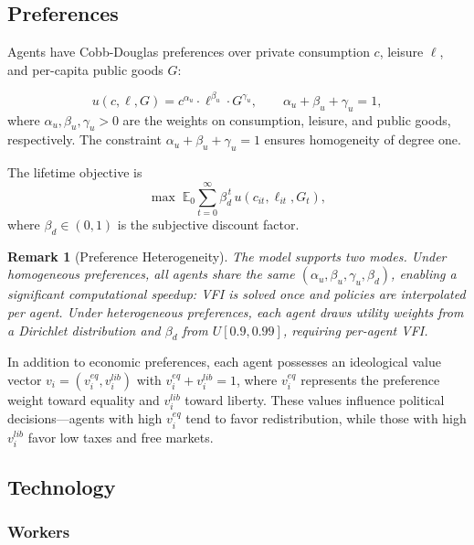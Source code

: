 \documentclass[12pt]{article}
\newtheorem{remark}{Remark}
\newcommand{\E}{\mathbb{E}}
\begin{document}
\subsection{Preferences}\label{sec:preferences}

Agents have Cobb-Douglas preferences over private consumption $c$, leisure $\ell$, and per-capita public goods $G$:

\begin{equation}\label{eq:utility}
  u(c, \ell, G) = c^{\alpha_u} \cdot \ell^{\beta_u} \cdot G^{\gamma_u}, \qquad \alpha_u + \beta_u + \gamma_u = 1,
\end{equation}
where $\alpha_u, \beta_u, \gamma_u > 0$ are the weights on consumption, leisure, and public goods, respectively. The constraint $\alpha_u + \beta_u + \gamma_u = 1$ ensures homogeneity of degree one.

The lifetime objective is
\begin{equation}\label{eq:lifetime}
  \max \; \E_0 \sum_{t=0}^{\infty} \beta_d^{\, t} \, u(c_{it}, \ell_{it}, G_t),
\end{equation}
where $\beta_d \in (0, 1)$ is the subjective discount factor.

\begin{remark}[Preference Heterogeneity]
The model supports two modes. Under \emph{homogeneous preferences}, all agents share the same $(\alpha_u, \beta_u, \gamma_u, \beta_d)$, enabling a significant computational speedup: VFI is solved once and policies are interpolated per agent. Under \emph{heterogeneous preferences}, each agent draws utility weights from a Dirichlet distribution and $\beta_d$ from $U[0.9, 0.99]$, requiring per-agent VFI.
\end{remark}

In addition to economic preferences, each agent possesses an ideological value vector $v_i = (v_i^{eq}, v_i^{lib})$ with $v_i^{eq} + v_i^{lib} = 1$, where $v_i^{eq}$ represents the preference weight toward equality and $v_i^{lib}$ toward liberty. These values influence political decisions---agents with high $v_i^{eq}$ tend to favor redistribution, while those with high $v_i^{lib}$ favor low taxes and free markets.


\subsection{Technology}\label{sec:technology}

\subsubsection{Workers}
\end{document}
